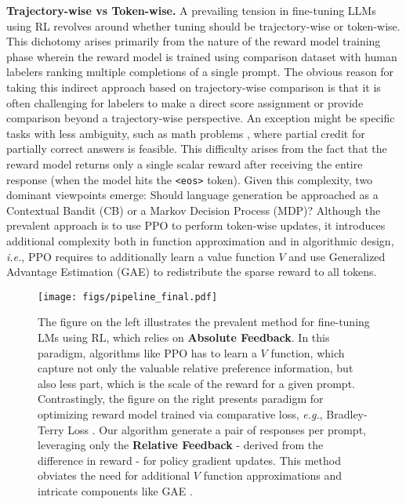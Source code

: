 \documentclass{article} %
\begin{document}
\textbf{Trajectory-wise vs Token-wise.} 
A prevailing tension in fine-tuning LLMs using RL revolves around whether tuning should be trajectory-wise or token-wise. This dichotomy arises primarily from the nature of the reward model training phase wherein the reward model is trained using comparison dataset with human labelers ranking multiple completions of a single prompt. The obvious reason for taking this indirect approach based on trajectory-wise comparison is that it is often challenging for labelers to make a direct score assignment or provide comparison beyond a trajectory-wise perspective. An exception might be specific tasks with less ambiguity, such as math problems \citep{lightman2023let}, where partial credit for partially correct answers is feasible. This difficulty arises from the fact that the reward model returns only a single scalar reward after receiving the entire response (when the model hits the \texttt{<eos>} token). Given this complexity, two dominant viewpoints emerge: Should language generation be approached as a Contextual Bandit (CB) or a Markov Decision Process (MDP)? Although the prevalent approach is to use PPO to perform token-wise updates, it introduces additional complexity both in function approximation and in algorithmic design, \textit{i.e.}, PPO requires to additionally learn a value function $V$ and use Generalized Advantage Estimation (GAE) 
\citep{schulman2015high} to redistribute the sparse reward to all tokens.
\begin{figure}[t]
\centering
\texttt{[image: figs/pipeline\_final.pdf]}
\caption{The figure on the left illustrates the prevalent method for fine-tuning LMs using RL, which relies on \textbf{Absolute Feedback}. In this paradigm, algorithms like PPO has to learn a $V$ function, which capture not only the valuable relative preference information, but also less part, which is the scale of the reward for a given prompt. Contrastingly, the figure on the right presents paradigm for optimizing reward model trained via comparative loss, \textit{e.g.}, Bradley-Terry Loss \citep{bradley1952rank}. Our algorithm generate a pair of responses per prompt, leveraging only the \textbf{Relative Feedback} - derived from the difference in reward - for policy gradient updates. This method obviates the need for additional $V$ function approximations and intricate components like GAE \citep{schulman2015high}.}
\vspace{-10pt}
\label{figure:pipeline}
\end{figure}
\end{document}
